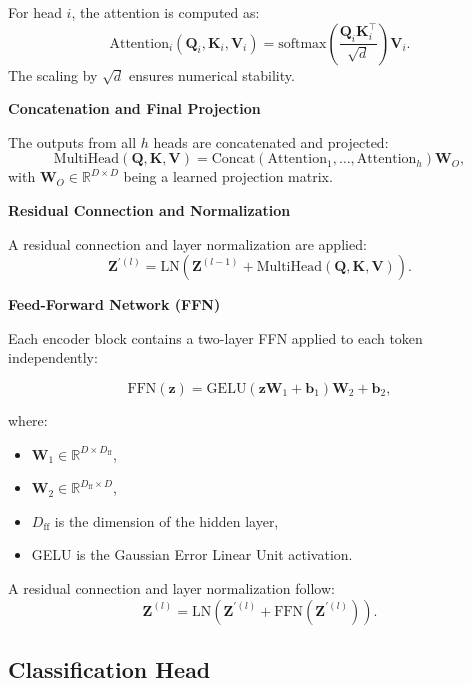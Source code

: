 For head \(i\), the attention is computed as:
\[
\text{Attention}_i(\mathbf{Q}_i, \mathbf{K}_i, \mathbf{V}_i) = \text{softmax}\left(\frac{\mathbf{Q}_i \mathbf{K}_i^\top}{\sqrt{d}}\right) \mathbf{V}_i.
\]
The scaling by \(\sqrt{d}\) ensures numerical stability.

\textbf{Concatenation and Final Projection}

The outputs from all \(h\) heads are concatenated and projected:
\[
\text{MultiHead}(\mathbf{Q}, \mathbf{K}, \mathbf{V}) = \text{Concat}\left(\text{Attention}_1, \dots, \text{Attention}_h\right) \mathbf{W}_O,
\]
with \(\mathbf{W}_O \in \mathbb{R}^{D \times D}\) being a learned projection matrix.

\textbf{Residual Connection and Normalization}

A residual connection and layer normalization are applied:
\[
\mathbf{Z}^{\prime(l)} = \text{LN}\left(\mathbf{Z}^{(l-1)} + \text{MultiHead}(\mathbf{Q}, \mathbf{K}, \mathbf{V})\right).
\]

\textbf{Feed-Forward Network (FFN)}

Each encoder block contains a two-layer FFN applied to each token independently:

\begin{equation}
    \text{FFN}(\mathbf{z}) = \text{GELU}\left(\mathbf{z} \mathbf{W}_1 + \mathbf{b}_1\right) \mathbf{W}_2 + \mathbf{b}_2,
\end{equation}

where:
\begin{itemize}
    \item \(\mathbf{W}_1 \in \mathbb{R}^{D \times D_{\text{ff}}}\),
    \item \(\mathbf{W}_2 \in \mathbb{R}^{D_{\text{ff}} \times D}\),
    \item \(D_{\text{ff}}\) is the dimension of the hidden layer,
    \item GELU is the Gaussian Error Linear Unit activation.
\end{itemize}

A residual connection and layer normalization follow:
\begin{equation}
    \mathbf{Z}^{(l)} = \text{LN}\left(\mathbf{Z}^{\prime(l)} + \text{FFN}(\mathbf{Z}^{\prime(l)})\right).
\end{equation}

\subsection{Classification Head}

